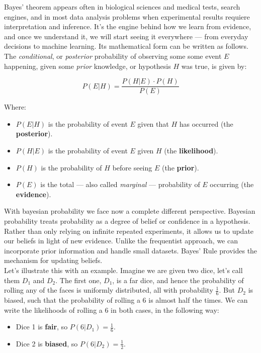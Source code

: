 \documentclass{book}
\begin{document}
Bayes’ theorem appears often in biological sciences and medical tests, search engines, and in most data analysis problems when experimental results requiere interpretation and inference. It’s the engine behind how we learn from evidence, and once we understand it, we will start seeing it everywhere — from everyday decisions to machine learning. Its mathematical form can be written as follows. The \textit{conditional}, or \textit{posterior} probability of observing some some event $E$ happening, given some \textit{prior} knowledge, or hypothesis $H$ was true, is given by:

\begin{equation}
P(E|H) = \frac{P(H|E) \cdot P(H)}{P(E)}
\end{equation}

Where:
\begin{itemize}
  \item $P(E|H)$ is the probability of event $E$ given that $H$ has occurred (the \textbf{posterior}).
  \item $P(H|E)$ is the probability of event $E$ given $H$ (the \textbf{likelihood}).
  \item $P(H)$ is the probability of $H$ before seeing $E$ (the \textbf{prior}).
  \item $P(E)$ is the total — also called \textit{marginal} — probability of $E$ occurring (the \textbf{evidence}).
\end{itemize}

With bayesian probability we face now a complete different perspective. Bayesian probability treats probability as a degree of belief or confidence in a hypothesis. Rather than only relying on infinite repeated experiments, it allows us to update our beliefs in light of new evidence. Unlike the frequentist approach, we can incorporate prior information and handle small datasets. Bayes’ Rule provides the mechanism for updating beliefs.\\

Let's illustrate this with an example. Imagine we are given two dice, let's call them $D_1$ and $D_2$. The first one, $D_1$, is a far dice, and hence the probability of rolling any of the faces is uniformly distributed, all with probability $\frac{1}{6}$. But $D_2$ is biased, such that the probability of rolling a 6 is almost half the times. We can write the likelihoods of rolling a 6 in both cases, in the following way:
\begin{itemize}
  \item Dice 1 is \textbf{fair}, so $P(6|D_1) = \frac{1}{6}$.
  \item Dice 2 is \textbf{biased}, so $P(6|D_2) = \frac{1}{2}$.
\end{itemize}
\end{document}
